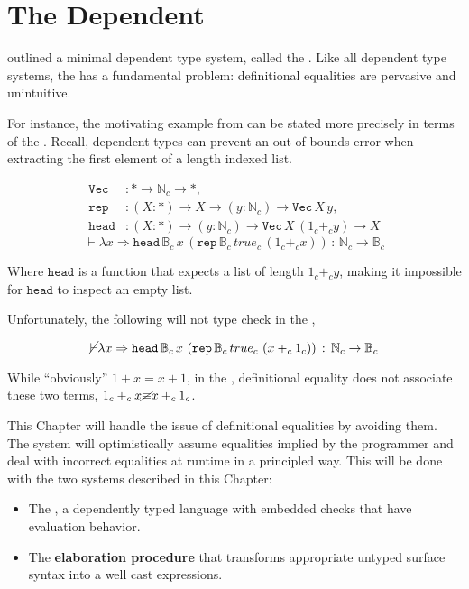 \chapter{The Dependent \CSys{}}
\label{chapter:Cast}
\thispagestyle{myheadings}
 
 outlined a minimal dependent type system, called the \slang{}.
Like all dependent type systems, the \slang{} has a fundamental problem: definitional equalities are pervasive and unintuitive.
 
For instance, the motivating example from  can be stated more precisely in terms of the \slang{}.
Recall, dependent types can prevent an out-of-bounds error when extracting the first element of a length indexed list.

\begin{align*}
\mathtt{Vec} & :*\rightarrow\mathbb{N}_{c}\rightarrow*,\\
\mathtt{rep} & :\left(X:*\right)\rightarrow X\rightarrow\left(y:\mathbb{N}_{c}\right)\rightarrow\mathtt{Vec\,}X\,y,\\
\mathtt{head} & :\left(X:*\right)\rightarrow\left(y:\mathbb{N}_{c}\right)\rightarrow\mathtt{Vec}\,X\,\left(1_{c}+_{c}y\right)\rightarrow X
\end{align*}
\[
\vdash\lambda x\Rightarrow\mathtt{head}\,\mathbb{B}_{c}\,x\,\left(\mathtt{rep}\,\mathbb{B}_{c}\,true_{c}\,\left(1_{c}+_{c}x\right)\right)\,:\,\mathbb{N}_{c}\rightarrow\mathbb{B}_{c}
\]

Where $\mathtt{head}$ is a function that expects a list of length $1_{c}+_{c}y$, making it impossible for $\mathtt{head}$ to inspect an empty list.

Unfortunately, the following will not type check in the \slang{},

\[
\cancel{\vdash}\lambda x\Rightarrow\mathtt{head}\,\mathbb{B}_{c}\,x\,\left(\mathtt{rep}\,\mathbb{B}_{c}\,true_{c}\,\left(x+_{c}1_{c}\right)\right)\,:\,\mathbb{N}_{c}\rightarrow\mathbb{B}_{c}
\]

While ``obviously'' $1+x=x+1$, in the \slang{}, definitional equality does not associate these two terms, $1_{c}+_{c}x\cancel{\equiv}x+_{c}1_{c}$.
 
This Chapter will handle the issue of definitional equalities by avoiding them.
The system will optimistically assume equalities implied by the programmer and deal with incorrect equalities at runtime in a principled way.
This will be done with the two systems described in this Chapter:
\begin{itemize}
\item The \textbf{\clang{}}, a dependently typed language with embedded  checks that have evaluation behavior.
\item The \textbf{elaboration procedure} that transforms appropriate untyped surface syntax into a well cast expressions.
\end{itemize}

